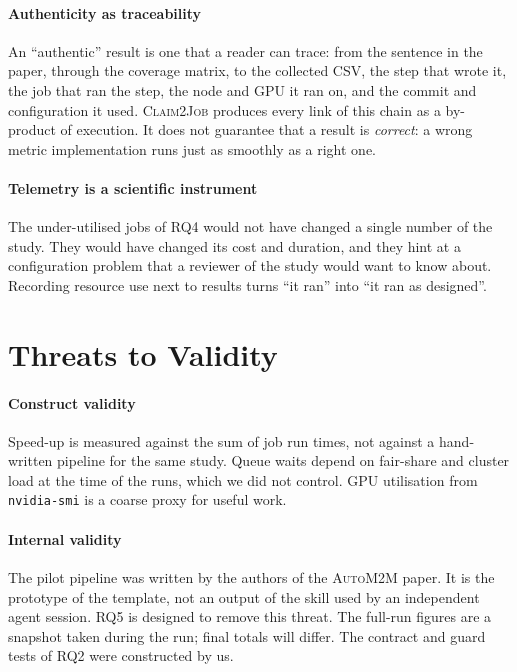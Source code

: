 \documentclass[pdflatex,sn-mathphys-num]{sn-jnl}
\theoremstyle{thmstyleone}%
\theoremstyle{thmstyletwo}%
\theoremstyle{thmstylethree}%
\newcommand{\cj}{\textsc{Claim2Job}}
\newcommand{\auto}{\textsc{AutoM2M}}
\newcommand{\code}[1]{\texttt{#1}}
\begin{document}
\paragraph{Authenticity as traceability} An ``authentic'' result is one that a
reader can trace: from the sentence in the paper, through the coverage matrix,
to the collected CSV, the step that wrote it, the job that ran the step, the
node and GPU it ran on, and the commit and configuration it used. \cj{}
produces every link of this chain as a by-product of execution. It does not
guarantee that a result is \emph{correct}: a wrong metric implementation runs
just as smoothly as a right one.

\paragraph{Telemetry is a scientific instrument} The under-utilised jobs of
RQ4 would not have changed a single number of the study. They would have
changed its cost and duration, and they hint at a configuration problem that a
reviewer of the study would want to know about. Recording resource use next to
results turns ``it ran'' into ``it ran as designed''.

\section{Threats to Validity}\label{sec:threats}

\paragraph{Construct validity} Speed-up is measured against the sum of job run
times, not against a hand-written pipeline for the same study. Queue waits
depend on fair-share and cluster load at the time of the runs, which we did not
control. GPU utilisation from \code{nvidia-smi} is a coarse proxy for useful
work.

\paragraph{Internal validity} The pilot pipeline was written by the authors of
the \auto{} paper. It is the prototype of the template, not an output of the
skill used by an independent agent session. RQ5 is designed to remove this
threat. The full-run figures are a snapshot taken during the run; final totals
will differ. The contract and guard tests of RQ2 were constructed by us.
\end{document}
